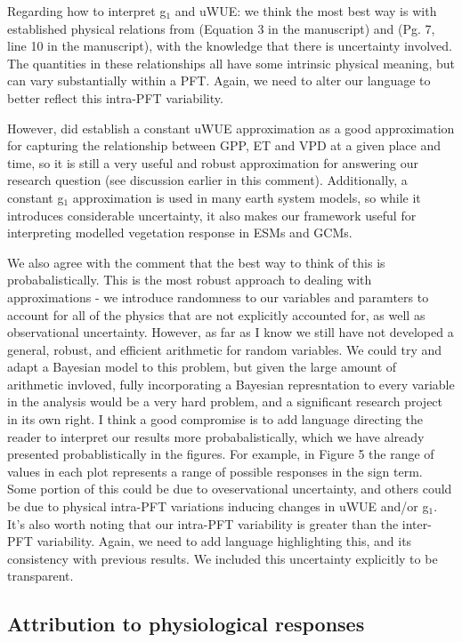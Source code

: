 Regarding how to interpret g$_1$ and uWUE: we think the most best way
is with established physical relations from \cite{MEDLYN_2011}
(Equation 3 in the manuscript) and \cite{Zhou_2014} (Pg. 7, line 10 in
the manuscript), with the knowledge that there is uncertainty
involved. The quantities in these relationships all have some
intrinsic physical meaning, but can vary substantially within a
PFT. Again, we need to alter our language to better reflect this
intra-PFT variability.

However, \cite{Zhou_2014} did establish a constant uWUE approximation
as a good approximation for capturing the relationship between GPP, ET
and VPD at a given place and time, so it is still a very useful and
robust approximation for answering our research question (see
discussion earlier in this comment). Additionally, a constant g$_1$
approximation is used in many earth system models, so while it
introduces considerable uncertainty, it also makes our framework
useful for interpreting modelled vegetation response in ESMs and GCMs.

We also agree with the comment that the best way to think of this is
probabalistically. This is the most robust approach to dealing with
approximations - we introduce randomness to our variables and
paramters to account for all of the physics that are not explicitly
accounted for, as well as observational uncertainty. However, as far
as I know we still have not developed a general, robust, and efficient
arithmetic for random variables. We could try and adapt a Bayesian
model to this problem, but given the large amount of arithmetic
invloved, fully incorporating a Bayesian represntation to every
variable in the analysis would be a very hard problem, and a
significant research project in its own right. I think a good
compromise is to add language directing the reader to interpret our
results more probabalistically, which we have already presented
probablistically in the figures. For example, in Figure 5 the range
of values in each plot represents a range of possible responses in the
sign term. Some portion of this could be due to oveservational
uncertainty, and others could be due to physical intra-PFT variations
inducing changes in uWUE and/or g$_1$. It's also worth noting that our
intra-PFT variability is greater than the inter-PFT
variability. Again, we need to add language highlighting this, and its
consistency with previous results. We included this uncertainty
explicitly to be transparent.

\subsection{Attribution to physiological responses}

